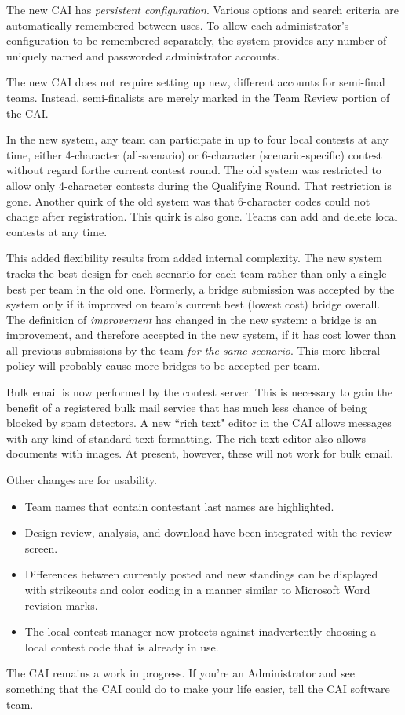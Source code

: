 \documentclass[11pt,letterpaper]{refart}
\begin{document}
The new CAI has \emph{persistent configuration}. Various options and
search criteria are automatically remembered between uses.  To allow each 
administrator's configuration
to be remembered separately, the system provides any number of uniquely named and
passworded administrator accounts.

The new CAI does not require setting up new, different accounts for semi-final teams. 
Instead, semi-finalists are merely marked in the Team Review portion of the CAI.  

In the new system, any team can participate in up to four local contests at any time, either 
4-character (all-scenario) or 6-character (scenario-specific) contest without regard forthe 
current contest round. The old system was restricted to allow only 4-character contests 
during the Qualifying Round. That restriction is gone.  Another quirk of the 
old system was that 6-character codes could not change after registration.  This quirk is 
also gone. Teams can add and delete local contests at any time. 

This added flexibility results from added internal complexity. The new system tracks the  best  design for each scenario for each team rather than only a single best per team in 
the old one.  Formerly, a bridge submission was accepted by the system only if 
it improved on team's current best (lowest cost) bridge overall.  The definition of 
\emph{improvement} has changed in the new system: a bridge is an improvement, and 
therefore accepted in the new system, if it has cost
lower than all previous submissions by the team \emph{for the same scenario}.  This
more liberal policy will probably cause more bridges to be accepted per team. 

Bulk email is now performed by the contest server. This is necessary to gain the benefit of
a registered bulk mail service that has much less chance of being blocked by spam detectors.
A new ``rich text" editor in the CAI allows messages with any kind of standard text formatting.
The rich text editor also allows documents with images.  At present, however, these will
not work for bulk email.

Other changes are for usability. 
\begin{itemize}
\item Team names that contain contestant last names are highlighted.
\item Design review, analysis, and download have been integrated with the review screen. 
\item Differences between currently posted and new standings can be displayed with 
  strikeouts and color coding in a manner similar to Microsoft Word revision marks. 
\item The local contest manager now protects against inadvertently choosing a local 
  contest code that is already in use.
\end{itemize}
The CAI remains a work in progress. If you're an Administrator and see something
that the CAI could do to make your life easier, tell the CAI software team.
\end{document}
